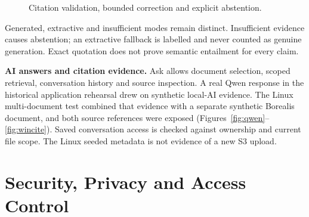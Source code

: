 \begin{figure}[htbp]
\centering
{}
\caption{Citation validation, bounded correction and explicit abstention.}
\label{fig:cite}
\end{figure}

Generated, extractive and insufficient modes remain distinct. Insufficient evidence causes abstention; an extractive fallback is labelled and never counted as genuine generation. Exact quotation does not prove semantic entailment for every claim.

\textbf{AI answers and citation evidence.} Ask allows document selection, scoped retrieval, conversation history and source inspection. A real Qwen response in the historical application rehearsal drew on synthetic local-AI evidence. The Linux multi-document test combined that evidence with a separate synthetic Borealis document, and both source references were exposed (Figures~\ref{fig:qwen}--\ref{fig:wincite}). Saved conversation access is checked against ownership and current file scope. The Linux seeded metadata is not evidence of a new S3 upload.

\section{Security, Privacy and Access Control}

